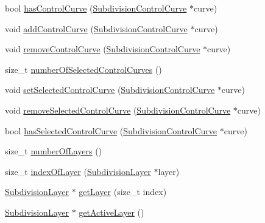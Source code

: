 \begin{DoxyCompactItemize}
\item 
bool \hyperlink{classShipCADGeometry_1_1SubdivisionSurface_acc30feeff1a889b9b291dcab3987b30a}{has\-Control\-Curve} (\hyperlink{classShipCADGeometry_1_1SubdivisionControlCurve}{Subdivision\-Control\-Curve} $\ast$curve)
\item 
void \hyperlink{classShipCADGeometry_1_1SubdivisionSurface_aa01ccc2ce7417960ca13075e38eb98e6}{add\-Control\-Curve} (\hyperlink{classShipCADGeometry_1_1SubdivisionControlCurve}{Subdivision\-Control\-Curve} $\ast$curve)
\item 
void \hyperlink{classShipCADGeometry_1_1SubdivisionSurface_abd51f7744580144550fabc086ea991b4}{remove\-Control\-Curve} (\hyperlink{classShipCADGeometry_1_1SubdivisionControlCurve}{Subdivision\-Control\-Curve} $\ast$curve)
\item 
size\-\_\-t \hyperlink{classShipCADGeometry_1_1SubdivisionSurface_afe8e08b4471e106cfae40b3aa7e00f8e}{number\-Of\-Selected\-Control\-Curves} ()
\item 
void \hyperlink{classShipCADGeometry_1_1SubdivisionSurface_a5614a6ea5e1b67ec516328d64574cd9e}{set\-Selected\-Control\-Curve} (\hyperlink{classShipCADGeometry_1_1SubdivisionControlCurve}{Subdivision\-Control\-Curve} $\ast$curve)
\item 
void \hyperlink{classShipCADGeometry_1_1SubdivisionSurface_a1666628c8232ba11d386641fa7980ed7}{remove\-Selected\-Control\-Curve} (\hyperlink{classShipCADGeometry_1_1SubdivisionControlCurve}{Subdivision\-Control\-Curve} $\ast$curve)
\item 
bool \hyperlink{classShipCADGeometry_1_1SubdivisionSurface_acdfbfb4870bf517cd075fdf51a0de997}{has\-Selected\-Control\-Curve} (\hyperlink{classShipCADGeometry_1_1SubdivisionControlCurve}{Subdivision\-Control\-Curve} $\ast$curve)
\item 
size\-\_\-t \hyperlink{classShipCADGeometry_1_1SubdivisionSurface_a5dc4e6210058c2648bc7adefdf90c949}{number\-Of\-Layers} ()
\item 
size\-\_\-t \hyperlink{classShipCADGeometry_1_1SubdivisionSurface_accb1e8604e44f491f84e9fb77d1ab5c7}{index\-Of\-Layer} (\hyperlink{classShipCADGeometry_1_1SubdivisionLayer}{Subdivision\-Layer} $\ast$layer)
\item 
\hyperlink{classShipCADGeometry_1_1SubdivisionLayer}{Subdivision\-Layer} $\ast$ \hyperlink{classShipCADGeometry_1_1SubdivisionSurface_a24b230e51a0c5fb3e7f51d0e2340eb9f}{get\-Layer} (size\-\_\-t index)
\item 
\hyperlink{classShipCADGeometry_1_1SubdivisionLayer}{Subdivision\-Layer} $\ast$ \hyperlink{classShipCADGeometry_1_1SubdivisionSurface_a3d5b8cb035b43b48e4a4a3cb11a5c230}{get\-Active\-Layer} ()

\end{DoxyCompactItemize}
